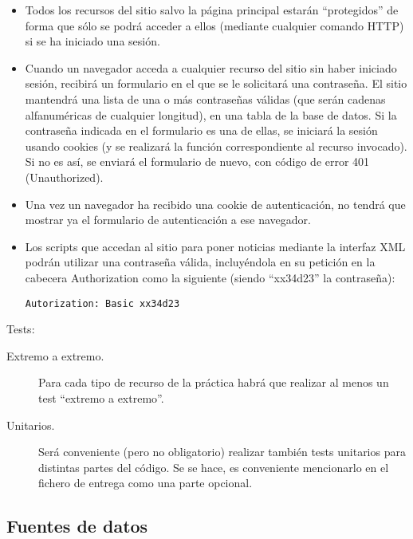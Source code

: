 \begin{itemize}
\item Todos los recursos del sitio salvo la página principal estarán ``protegidos'' de forma que sólo se podrá acceder a ellos (mediante cualquier comando HTTP) si se ha iniciado una sesión.
  
\item Cuando un navegador acceda a cualquier recurso del sitio sin haber iniciado sesión, recibirá un formulario en el que se le solicitará una contraseña. El sitio mantendrá una lista de una o más contraseñas válidas (que serán cadenas alfanuméricas de cualquier longitud), en una tabla de la base de datos. Si la contraseña indicada en el formulario es una de ellas, se iniciará la sesión usando cookies (y se realizará la función correspondiente al recurso invocado). Si no es así, se enviará el formulario de nuevo, con código de error 401 (Unauthorized).

\item Una vez un navegador ha recibido una cookie de autenticación, no tendrá que mostrar ya el formulario de autenticación a ese navegador.
  
\item Los scripts que accedan al sitio para poner noticias mediante la interfaz XML podrán utilizar una contraseña válida, incluyéndola en su petición en la cabecera Authorization como la siguiente (siendo ``xx34d23'' la contraseña):

\begin{verbatim}
Autorization: Basic xx34d23
\end{verbatim}

\end{itemize}


Tests:

\begin{description}
\item[Extremo a extremo.] Para cada tipo de recurso de la práctica habrá que realizar al menos un test ``extremo a extremo''.
\item[Unitarios.] Será conveniente (pero no obligatorio) realizar también tests unitarios para distintas partes del código. Se se hace, es conveniente mencionarlo en el fichero de entrega como una parte opcional.
\end{description}

\subsection{Fuentes de datos}
\label{sec:practica-2025-05:datos}

